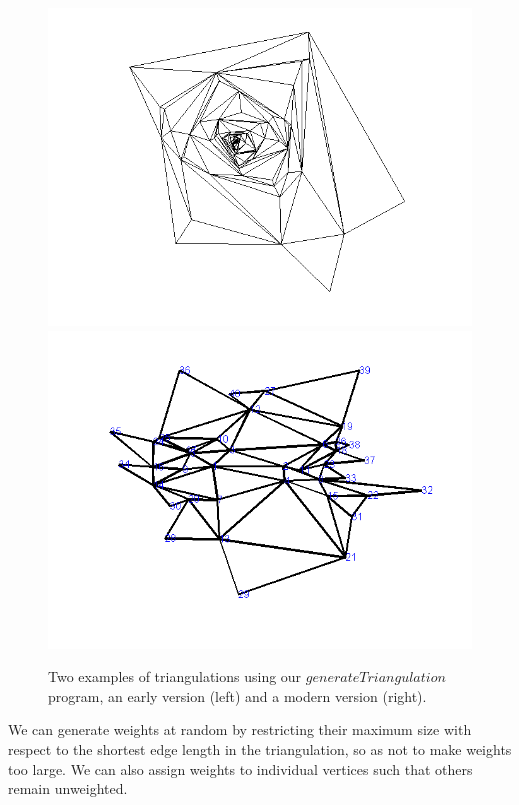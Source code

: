 \documentclass[12pt]{article}
\begin{document}
\begin{figure}
\centering
\includegraphics[scale = 0.45]{Pictures/gentri.png}
\includegraphics[scale = 0.45]{Pictures/gentri6.png}
\caption{Two examples of triangulations using our $generateTriangulation$ program, an early version (left) and a modern version (right).}
\end{figure}

\noindent We can generate weights at random by restricting their maximum size with respect to the shortest edge length in the triangulation, so as not to make weights too large. We can also assign weights to individual vertices such that others remain unweighted. \newline
\end{document}
